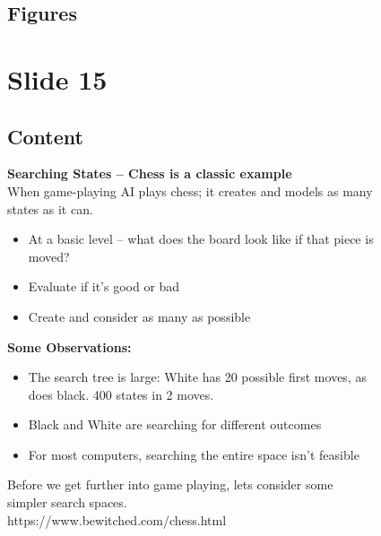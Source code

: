\documentclass{article}%
\begin{document}
\subsection{Figures}%
\begin{figure}[H]%
\centering%
\end{figure}

%
\newpage%
\section{Slide 15}%
\label{sec:Slide15}%
\subsection{Content}%

\textbf{Searching States – Chess is a classic example} \\
When game-playing AI plays chess; it creates and models as many \\
states as it can. \\
\begin{itemize}
    \item At a basic level – what does the board look like if that piece is \\
    moved?
    \item Evaluate if it’s good or bad
    \item Create and consider as many as possible
\end{itemize}
\textbf{Some Observations:} \\
\begin{itemize}
    \item The search tree is large: White has 20 possible first moves, as \\
    does black. 400 states in 2 moves.
    \item Black and White are searching for different outcomes
    \item For most computers, searching the entire space isn’t feasible
\end{itemize}
Before we get further into game playing, lets consider some \\
simpler search spaces. \\
https://www.bewitched.com/chess.html
%
\end{document}
